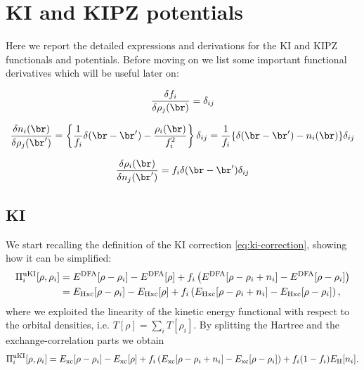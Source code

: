 \chapter{KI and KIPZ potentials\label{app:ki-kipz}}
Here we report the detailed expressions and derivations for the KI and KIPZ functionals and potentials. Before moving on we list some important functional derivatives which will be useful later on:

\begin{equation}
    \frac{\delta f_i}{\delta \rho_j(\br)} = \delta_{ij}
    \label{eq:deriv-occupancy-density}
\end{equation}

\begin{equation}
    \frac{\delta n_i(\br)}{\delta \rho_j(\br')} = \left\{ \frac{1}{f_i} \delta(\br-\br') - \frac{\rho_i(\br)}{f_i^2} \right\} \delta_{ij} = \frac{1}{f_i}\{ \delta(\br-\br') - n_i(\br) \} \delta_{ij}
    \label{eq:deriv-density-density}
\end{equation}

\begin{equation}
    \frac{\delta \rho_i(\br)}{\delta n_j(\br')} = f_i \delta(\br-\br') \delta_{ij}
    \label{eq:deriv-density-density-inv}
\end{equation}

\vspace{1cm}
\section*{KI}
We start recalling the definition of the KI correction \eqref{eq:ki-correction}, showing how it can be simplified:
%
\begin{equation}
    \begin{split}
    \Pi^{\rm uKI}_i[\rho,\rho_i] &= E^{\rm DFA}[\rho-\rho_i] - E^{\rm DFA}[\rho]
         + f_i \left( E^{\rm DFA}[\rho-\rho_i+n_i] - E^{\rm DFA}[\rho-\rho_i] \right) \\
         &= E_{\rm Hxc}[\rho-\rho_i] - E_{\rm Hxc}[\rho]
         + f_i \left( E_{\rm Hxc}[\rho-\rho_i+n_i] - E_{\rm Hxc}[\rho-\rho_i] \right) ,
    \end{split}
    \label{eq:app-ki-functional}
\end{equation}
%
where we exploited the linearity of the kinetic energy functional with respect to the orbital densities, i.e. $T[\rho] = \sum_i T[\rho_i]$. By splitting the Hartree and the exchange-correlation parts we obtain
%
\begin{equation}
    \begin{split}
    \Pi^{\rm uKI}_i[\rho,\rho_i] = E_{\rm xc}[\rho-\rho_i] - E_{\rm xc}[\rho]
         + f_i \left( E_{\rm xc}[\rho-\rho_i+n_i] - E_{\rm xc}[\rho-\rho_i] \right)
         + f_i(1-f_i) E_{\text{H}}[n_i] .
    \end{split}
    \label{eq:app-ki-functional-xc-only}
\end{equation}

